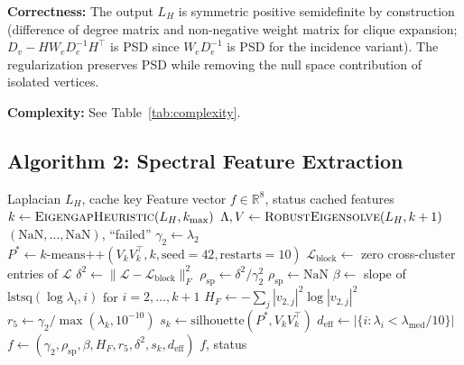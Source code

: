 \documentclass[12pt]{article}
\begin{document}
\textbf{Correctness:} The output $L_H$ is symmetric positive semidefinite
by construction (difference of degree matrix and non-negative weight matrix
for clique expansion; $D_v - H W_e D_e^{-1} H^\top$ is PSD since
$W_e D_e^{-1}$ is PSD for the incidence variant).  The regularization
preserves PSD while removing the null space contribution of isolated vertices.

\textbf{Complexity:} See Table~\ref{tab:complexity}.

\subsection{Algorithm 2: Spectral Feature Extraction}

\begin{algorithm}[ht]
\caption{Spectral Feature Extraction}
\label{alg:features}
\begin{algorithmic}[1]
\Require Laplacian $L_H$, cache key
\Ensure Feature vector $f \in \mathbb{R}^8$, status
 \Return cached features \EndIf
\State $k \gets \textsc{EigengapHeuristic}(L_H, k_{\max})$
\State $\Lambda, V \gets \textsc{RobustEigensolve}(L_H, k+1)$
  \State \Return $(\mathrm{NaN}, \ldots, \mathrm{NaN})$, ``failed''
\EndIf
\State $\gamma_2 \gets \lambda_2$
\State $P^* \gets k\text{-means++}(V_k V_k^\top, k, \text{seed}=42, \text{restarts}=10)$
\State $\mathcal{L}_{\mathrm{block}} \gets$ zero cross-cluster entries of $\mathcal{L}$
\State $\delta^2 \gets \|\mathcal{L} - \mathcal{L}_{\mathrm{block}}\|_F^2$
  \State $\rho_{\mathrm{sp}} \gets \delta^2 / \gamma_2^2$
\Else
  \State $\rho_{\mathrm{sp}} \gets \mathrm{NaN}$
\EndIf
\State $\beta \gets$ slope of $\mathrm{lstsq}(\log \lambda_i, i)$ for $i = 2, \ldots, k+1$
\State $H_F \gets -\sum_j |v_{2,j}|^2 \log |v_{2,j}|^2$
\State $r_5 \gets \gamma_2 / \max(\lambda_k, 10^{-10})$
\State $s_k \gets \mathrm{silhouette}(P^*, V_k V_k^\top)$
\State $d_{\mathrm{eff}} \gets |\{i : \lambda_i < \lambda_{\mathrm{med}}/10\}|$
\State $f \gets (\gamma_2, \rho_{\mathrm{sp}}, \beta, H_F, r_5, \delta^2, s_k, d_{\mathrm{eff}})$
\State \Return $f$, status
\end{algorithmic}
\end{algorithm}
\end{document}
